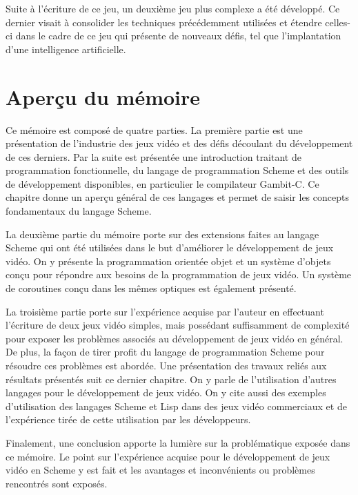 \documentclass[12pt,twoside,letterpaper,francais]{book}
\begin{document}
Suite à l'écriture de ce jeu, un deuxième jeu plus complexe a été
développé. Ce dernier visait à consolider les techniques précédemment
utilisées et étendre celles-ci dans le cadre de ce jeu qui présente de
nouveaux défis, tel que l'implantation d'une intelligence
artificielle.


\FloatBarrier
\section{Aperçu du mémoire}
Ce mémoire est composé de quatre parties. La première partie est une
présentation de l'industrie des jeux vidéo et des défis découlant du
dévelop\-pement de ces derniers. Par la suite est présentée une
introduction traitant de programmation fonctionnelle, du langage de
programmation Scheme et des outils de dévelop\-pement disponibles, en
particulier le compilateur Gambit-C. Ce chapitre donne un aperçu
général de ces langages et permet de saisir les concepts fondamentaux
du langage Scheme.

La deuxième partie du mémoire porte sur des extensions faites au
langage Scheme qui ont été utilisées dans le but d'améliorer le
dévelop\-pement de jeux vidéo. On y présente la programmation
orientée objet et un système d'objets conçu pour répondre aux besoins
de la programmation de jeux vidéo. Un système de coroutines conçu dans
les mêmes optiques est également présenté.

La troisième partie porte sur l'expérience acquise par l'auteur en
effectuant l'écriture de deux jeux vidéo simples, mais possédant
suffisamment de complexité pour exposer les problèmes associés au
dévelop\-pement de jeux vidéo en général. De plus, la façon de tirer
profit du langage de programmation Scheme pour résoudre ces
problèmes est abordée. Une présentation des travaux reliés aux
résultats présentés suit ce dernier chapitre. On y parle de
l'utilisation d'autres langages pour le dévelop\-pement de jeux
vidéo. On y cite aussi des exemples d'utilisation des langages
Scheme et Lisp dans des jeux vidéo commerciaux et de
l'expérience tirée de cette utilisation par les développeurs.

Finalement, une conclusion apporte la lumière sur la problématique
exposée dans ce mémoire. Le point sur l'expérience acquise pour le
dévelop\-pement de jeux vidéo en Scheme y est fait et les avantages
et inconvénients ou problèmes rencontrés sont exposés.


\clearpage

\end{document}
